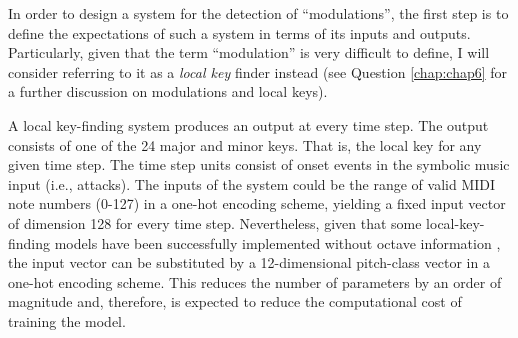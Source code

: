 









In order to design a system for the detection of
``modulations'', the first step is to define the
expectations of such a system in terms of its inputs and
outputs. Particularly, given that the term ``modulation'' is
very difficult to define, I will consider referring to it as
a \emph{local key} finder instead (see Question
\ref{chap:chap6} for a further discussion on modulations and
local keys).

A local key-finding system produces an output at every time
step. The output consists of one of the 24 major and minor
keys. That is, the local key for any given time step. The
time step units consist of onset events in the symbolic
music input (i.e., attacks). The inputs of the system could
be the range of valid MIDI note numbers (0-127) in a one-hot
encoding scheme, yielding a fixed input vector of dimension
128 for every time step. Nevertheless, given that some
local-key-finding models have been successfully implemented
without octave information
\parencite{napoleslopez2019keyfinding}, the input vector can
be substituted by a 12-dimensional pitch-class vector in a
one-hot encoding scheme. This reduces the number of
parameters by an order of magnitude and, therefore, is
expected to reduce the computational cost of training the
model.

